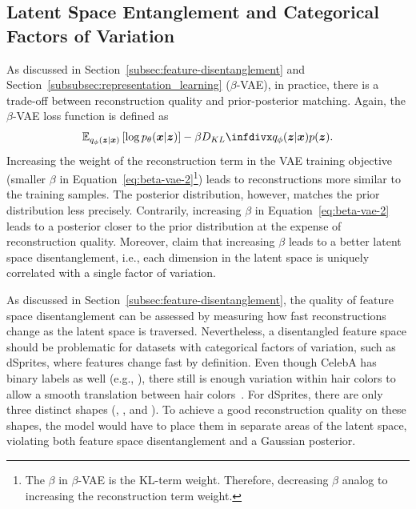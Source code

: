 \subsection{Latent Space Entanglement and Categorical Factors of Variation}\label{subsec:latent-space-entanglement-and-categorical-factors-of-variation}

As discussed in Section~\ref{subsec:feature-disentanglement} and Section~\ref{subsubsec:representation_learning} ($\beta$-\ac{VAE}), in practice, there is a trade-off between reconstruction quality and prior-posterior matching.
Again, the $\beta$-\ac{VAE} loss function is defined as
\begin{align}
    \mathbb{E}_{q_{\phi}(\bm{z} | \bm{x})}\left[\log p_{\theta}(\bm{x} | \bm{z})\right]-\beta \kldiv{q_{\phi}(\bm{z} | \bm{x})}{p(\bm{z})}. \label{eq:beta-vae-2}
\end{align}
Increasing the weight of the reconstruction term in the \ac{VAE} training objective (smaller $\beta$ in Equation~\ref{eq:beta-vae-2}\footnote{The $\beta$ in $\beta$-\ac{VAE} is the \ac{KL}-term weight. Therefore, decreasing $\beta$ analog to increasing the reconstruction term weight.}) leads to reconstructions more similar to the training samples.
The posterior distribution, however, matches the prior distribution less precisely.
Contrarily, increasing $\beta$ in Equation~\ref{eq:beta-vae-2} leads to a posterior closer to the prior distribution at the expense of reconstruction quality.
Moreover, \citet{higgins2017beta} claim that increasing $\beta$ leads to a better latent space disentanglement, i.e., each dimension in the latent space is uniquely correlated with a single factor of variation.

As discussed in Section~\ref{subsec:feature-disentanglement}, the quality of feature space disentanglement can be assessed by measuring how fast reconstructions change as the latent space is traversed.
Nevertheless, a disentangled feature space should be problematic for datasets with categorical factors of variation, such as dSprites, where features change fast by definition.
Even though CelebA has binary labels as well (e.g., ), there still is enough variation within hair colors to allow a smooth translation between hair colors~\citep{higgins2017beta}.
For dSprites, there are only three distinct shapes (, , and ).
To achieve a good reconstruction quality on these shapes, the model would have to place them in separate areas of the latent space, violating both feature space disentanglement and a Gaussian posterior.

